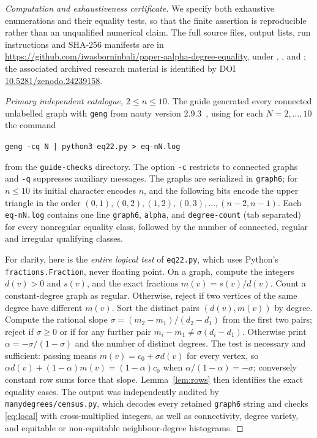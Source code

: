 \documentclass[11pt]{amsart}
\theoremstyle{remark}
\begin{document}
\begin{proof}[Computation and exhaustiveness certificate]
We specify both exhaustive enumerations and their equality tests,
so that the finite assertion is reproducible rather than an
unqualified numerical claim. The full source files, output lists,
run instructions and SHA-256 manifests are in
\url{https://github.com/iwasborninbali/paper-aalpha-degree-equality},
under ,
, and
; the associated archived research
material is identified by DOI \url{10.5281/zenodo.24239158}.

\emph{Primary independent catalogue, $2\leq n\leq10$.}
The guide generated every connected unlabelled graph with
\texttt{geng} from nauty version 2.9.3~\cite{McKayPiperno2014},
using for each $N=2,\ldots,10$ the command
\begin{center}
\texttt{geng -cq N | python3 eq22.py > eq-nN.log}
\end{center}
from the \texttt{guide-checks} directory. The option
\texttt{-c} restricts to connected graphs and \texttt{-q}
suppresses auxiliary messages. The graphs are serialized in
\texttt{graph6}; for $n\leq10$ its initial character encodes $n$,
and the following bits encode the upper triangle in the order
$(0,1),(0,2),(1,2),(0,3),\ldots,(n-2,n-1)$.
Each \texttt{eq-nN.log} contains one line
\texttt{graph6}, \texttt{alpha}, and \texttt{degree-count} (tab separated) for every
nonregular equality class, followed by the number of
connected, regular and irregular qualifying classes.

For clarity, here is the \emph{entire logical test} of
\texttt{eq22.py}, which uses Python's \texttt{fractions.Fraction},
never floating point. On a graph, compute the integers
$d(v)>0$ and $s(v)$, and the exact fractions
$m(v)=s(v)/d(v)$. Count a constant-degree graph as regular.
Otherwise, reject if two vertices of the same degree have
different $m(v)$. Sort the distinct pairs $(d(v),m(v))$
by degree. Compute the rational slope
$\sigma=(m_2-m_1)/(d_2-d_1)$ from the first two pairs;
reject if $\sigma\geq0$ or if for any further pair
$m_i-m_1\ne\sigma(d_i-d_1)$. Otherwise print
$\alpha=-\sigma/(1-\sigma)$ and the number of distinct
degrees. The test is necessary and sufficient: passing means
$m(v)=c_0+\sigma d(v)$ for every vertex, so
$\alpha d(v)+(1-\alpha)m(v)=(1-\alpha)c_0$
when $\alpha/(1-\alpha)=-\sigma$; conversely constant
row sums force that slope. Lemma~\ref{lem:rows} then
identifies the exact equality cases. The output was
independently audited by \texttt{manydegrees/census.py}, which
decodes every retained \texttt{graph6} string and checks
\eqref{eq:local} with cross-multiplied integers, as well as
connectivity, degree variety, and equitable or non-equitable
neighbour-degree histograms.


\end{proof}
\end{document}
